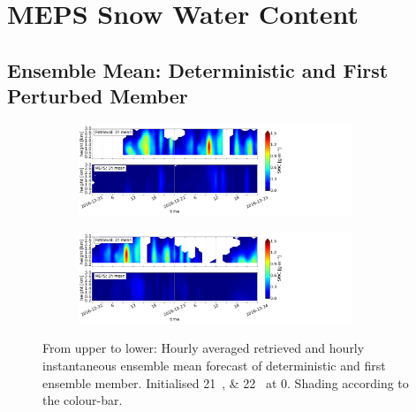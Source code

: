 \chapter{MEPS Snow Water Content}
\section{Ensemble Mean: Deterministic and First Perturbed Member}
\begin{figure}[ht!]%
	\centering
	\begin{subfigure}[t]{\textwidth}
		\centering
		\includegraphics[trim={0.cm 0.8cm 19.cm 0.5cm},clip,width=0.9\textwidth]{./fig_vert_SWC_1h/20161221}
		\caption{}\label{fig:SWC1h:21}
	\end{subfigure}
	\begin{subfigure}[t]{\textwidth}
		\centering
		\includegraphics[trim={0.cm 0.8cm 19.cm 0.5cm},clip,width=0.9\textwidth]{./fig_vert_SWC_1h/20161222}
		\caption{}\label{fig:SWC1h:22}
	\end{subfigure}
	\caption{From upper to lower: Hourly averaged retrieved and hourly instantaneous ensemble mean forecast of deterministic and first ensemble member. Initialised \SIlist{21;22}{\dec} at \SI{0}{\UTC}. Shading according to the colour-bar. }\label{fig:SWC1h}
\end{figure}
